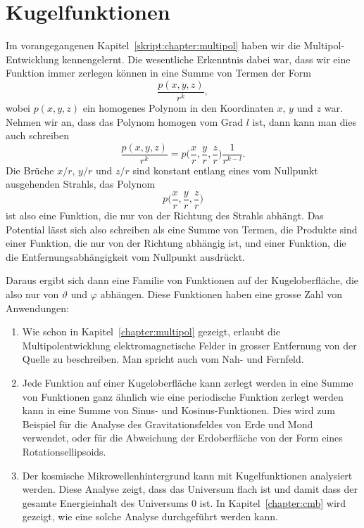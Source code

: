 %
%
%
\chapter{Kugelfunktionen%
\label{skript:chapter:kugelfunktionen}}
\rhead{}
Im vorangegangenen Kapitel~\ref{skript:chapter:multipol} haben wir
die Multipol-Entwicklung kennengelernt. 
Die wesentliche Erkenntnis dabei war, dass wir eine Funktion immer zerlegen
können in eine Summe von Termen der Form
\[
\frac{p(x,y,z)}{r^k},
\]
wobei $p(x,y,z)$ ein homogenes Polynom in den Koordinaten $x$, $y$ und
$z$ war.
Nehmen wir an, dass das Polynom homogen vom Grad $l$ ist, dann kann man dies
auch schreiben
\[
\frac{p(x,y,z)}{r^k}
=
p\biggl(\frac{x}{r},\frac{y}{r},\frac{z}{r}\biggr)\frac1{r^{k-l}}.
\]
Die Brüche $x/r$, $y/r$ und $z/r$ sind konstant entlang eines vom
Nullpunkt ausgehenden Strahls, das Polynom 
\[
p\biggl(\frac{x}{r},\frac{y}{r},\frac{z}{r}\biggr)
\]
ist also eine Funktion, die nur von der Richtung des Strahls
abhängt.
Das Potential lässt sich also schreiben als eine Summe von Termen,
die Produkte sind einer Funktion, die nur von der Richtung abhängig
ist, und einer Funktion, die die Entfernungsabhängigkeit vom Nullpunkt
ausdrückt.

Daraus ergibt sich dann eine Familie von Funktionen auf der Kugeloberfläche,
die also nur von $\vartheta$ und $\varphi$ abhängen.
Diese Funktionen haben eine grosse Zahl von Anwendungen:

\begin{enumerate}
\item
Wie schon in Kapitel~\ref{chapter:multipol} gezeigt, erlaubt 
die Multipolentwicklung elektromagnetische Felder in grosser
Entfernung von der Quelle zu beschreiben.
Man spricht auch vom Nah- und Fernfeld.
\item
Jede Funktion auf einer Kugeloberfläche kann zerlegt werden in eine
Summe von Funktionen ganz ähnlich wie eine periodische Funktion
zerlegt werden kann in eine Summe von Sinus- und Kosinus-Funktionen.
Dies wird zum Beispiel für die Analyse des Gravitationsfeldes von
Erde und Mond verwendet, oder für die Abweichung der Erdoberfläche
von der Form eines Rotationsellipsoids.
\item
Der kosmische Mikrowellenhintergrund kann mit Kugelfunktionen analysiert
werden.
Diese Analyse zeigt, dass das Universum flach ist und damit dass der
gesamte Energieinhalt des Universums $0$ ist.
In Kapitel~\ref{chapter:cmb} wird gezeigt, wie eine solche Analyse
durchgeführt werden kann.
\end{enumerate}

